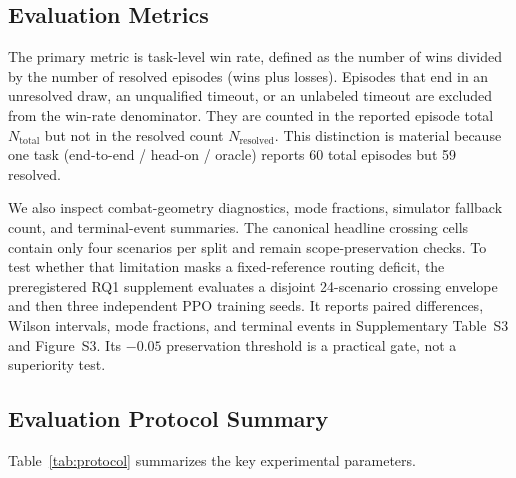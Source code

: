 \documentclass[5p,times]{elsarticle} %
\begin{document}
\subsection{Evaluation Metrics}

The primary metric is task-level win rate, defined as the number of wins divided by the number of resolved episodes (wins plus losses). Episodes that end in an unresolved draw, an unqualified timeout, or an unlabeled timeout are excluded from the win-rate denominator. They are counted in the reported episode total $N_{\text{total}}$ but not in the resolved count $N_{\text{resolved}}$. This distinction is material because one task (end-to-end / head-on / oracle) reports 60 total episodes but 59 resolved.

We also inspect combat-geometry diagnostics, mode fractions, simulator fallback count, and terminal-event summaries. The canonical headline crossing cells contain only four scenarios per split and remain scope-preservation checks. To test whether that limitation masks a fixed-reference routing deficit, the preregistered RQ1 supplement evaluates a disjoint 24-scenario crossing envelope and then three independent PPO training seeds. It reports paired differences, Wilson intervals, mode fractions, and terminal events in Supplementary Table~S3 and Figure~S3. Its $-0.05$ preservation threshold is a practical gate, not a superiority test.

\subsection{Evaluation Protocol Summary}
\label{subsec:protocol_summary}

Table~\ref{tab:protocol} summarizes the key experimental parameters.
\end{document}
